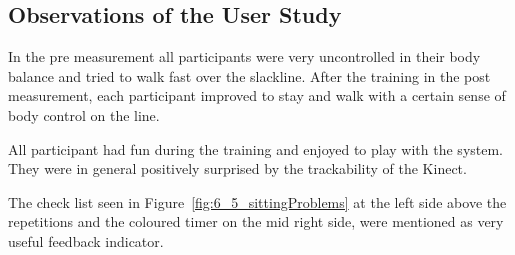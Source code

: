 \begin{table}[htb]
\centering
\caption{Interaction, time, and group effects on single leg stance, walking steps, and walked distance}
\label{tab:6_4_mainEffects}
\end{table}

\subsection{Observations of the User Study}\label{results_interview}
In the pre measurement all participants were very uncontrolled in their body balance and tried to walk fast over the slackline.
After the training in the post measurement, each participant improved to stay and walk with a certain sense of body control on the line.

All participant had fun during the training and enjoyed to play with the system.
They were in general positively surprised by the trackability of the Kinect.

The check list seen in Figure~\ref{fig:6_5_sittingProblems} at the left side above the repetitions and the coloured timer on the mid right side, were mentioned as very useful feedback indicator.

